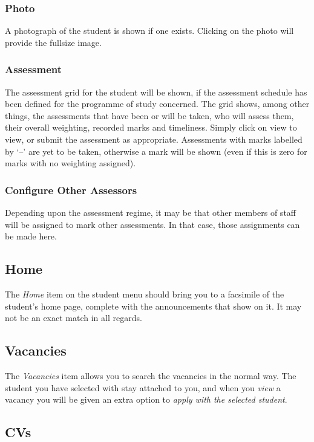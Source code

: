 \documentclass[12 pt]{book}
\begin{document}
\subsubsection{Photo}

A photograph of the student is shown if one exists. Clicking on the photo will
provide the fullsize image.

\subsubsection{Assessment}

The assessment grid for the student will be shown, if the assessment schedule
has been defined for the programme of study concerned. The grid shows, among
other things, the assessments that have been or will be taken, who will assess
them, their overall weighting, recorded marks and timeliness. Simply click on
view to view, or submit the assessment as appropriate. Assessments with marks
labelled by `--' are yet to be taken, otherwise a mark will be shown (even if
this is zero for marks with no weighting assigned).

\subsubsection{Configure Other Assessors}

Depending upon the assessment regime, it may be that other members of staff will
be assigned to mark other assessments. In that case, those assignments can be
made here.

\subsection{Home}

The \emph{Home} item on the student menu should bring you to a facsimile of the
student's home page, complete with the announcements that show on it. It may
not be an exact match in all regards.

\subsection{Vacancies}

The \emph{Vacancies} item allows you to search the vacancies in the normal way.
The student you have selected with stay attached to you, and when you
\emph{view} a vacancy you will be given an extra option to \emph{apply with
the selected student}.

\subsection{CVs}
\end{document}
